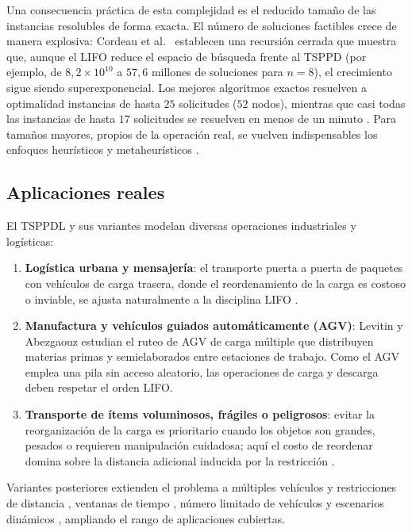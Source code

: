 \documentclass[conference]{IEEEtran}
\begin{document}
Una consecuencia práctica de esta complejidad es el reducido tamaño de las instancias resolubles de forma exacta. El número de soluciones factibles crece de manera explosiva: Cordeau et al.\ \cite{cordeau2010} establecen una recursión cerrada que muestra que, aunque el LIFO reduce el espacio de búsqueda frente al TSPPD (por ejemplo, de $8{,}2\times10^{10}$ a $57{,}6$ millones de soluciones para $n=8$), el crecimiento sigue siendo superexponencial. Los mejores algoritmos exactos resuelven a optimalidad instancias de hasta $25$ solicitudes ($52$ nodos), mientras que casi todas las instancias de hasta $17$ solicitudes se resuelven en menos de un minuto \cite{cordeau2010}. Para tamaños mayores, propios de la operación real, se vuelven indispensables los enfoques heurísticos y metaheurísticos \cite{li2011,cheang2012}.

\subsection{Aplicaciones reales}
El TSPPDL y sus variantes modelan diversas operaciones industriales y logísticas:

\begin{enumerate}
\item \textbf{Logística urbana y mensajería}: el transporte puerta a puerta de paquetes con vehículos de carga trasera, donde el reordenamiento de la carga es costoso o inviable, se ajusta naturalmente a la disciplina LIFO \cite{cordeau2010,andriansyah2018}.
\item \textbf{Manufactura y vehículos guiados automáticamente (AGV)}: Levitin y Abezgaouz \cite{levitin2003} estudian el ruteo de AGV de carga múltiple que distribuyen materias primas y semielaborados entre estaciones de trabajo. Como el AGV emplea una pila sin acceso aleatorio, las operaciones de carga y descarga deben respetar el orden LIFO.
\item \textbf{Transporte de ítems voluminosos, frágiles o peligrosos}: evitar la reorganización de la carga es prioritario cuando los objetos son grandes, pesados o requieren manipulación cuidadosa; aquí el costo de reordenar domina sobre la distancia adicional inducida por la restricción \cite{li2011,ruan2021}.
\end{enumerate}

Variantes posteriores extienden el problema a múltiples vehículos y restricciones de distancia \cite{cheang2012,gao2011}, ventanas de tiempo \cite{liu2019}, número limitado de vehículos \cite{andriansyah2018} y escenarios dinámicos \cite{du2023}, ampliando el rango de aplicaciones cubiertas.
\end{document}
